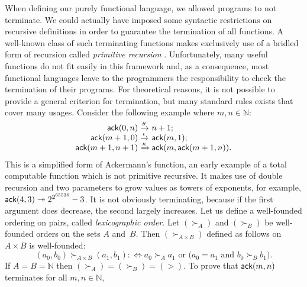 \label{par:ackermann}
When defining our purely functional language, we allowed programs to
not terminate. We could actually have imposed some syntactic
restrictions on recursive definitions in order to guarantee the
termination of all functions. A well\hyp{}known class of such
terminating functions makes exclusively use of a bridled form of
recursion called \emph{primitive recursion}
\citep{Robinson_1947,Robinson_1948}. Unfortunately, many useful functions do not fit easily
in this framework and, as a consequence, most functional languages
leave to the programmers the responsibility to check the termination
of their programs. For theoretical reasons, it is not possible to
provide a general criterion for termination, but many standard rules
exists that cover many usages. Consider the following example where
\(m,n \in \mathbb{N}\):
\begin{equation*}
\begin{array}{@{}r@{\;}l@{\;}l@{}}
\fun{ack}(0,n)     & \xrightarrow{\smash{\theta}} & n+1;\\
\fun{ack}(m+1,0)   & \xrightarrow{\smash{\iota}}  & \fun{ack}(m,1);\\
\fun{ack}(m+1,n+1) & \xrightarrow{\smash{\kappa}} 
                   & \fun{ack}(m,\fun{ack}(m+1,n)).
\end{array}
\end{equation*}
This is a simplified form of Ackermann's
function, an early example of a total
computable function which is not primitive recursive. It makes use of
double recursion and two parameters to grow values as towers of
exponents, for example, \(\textsf{ack}(4,3) \twoheadrightarrow
2^{2^{65536}} - 3\). It is not obviously terminating, because if the
first argument does decrease, the second largely increases. Let us
define a well\hyp{}founded ordering on pairs, called
\emph{lexicographic order}. Let
\((\succ_A)\) and \((\succ_B)\) be well\hyp{}founded orders on the
sets \(A\) and~\(B\). Then \((\succ_{A \times B})\) defined as follows
on \(A \times B\) is well\hyp{}founded:
\begin{equation}
(a_0,b_0) \succ_{A \times B} (a_1,b_1) :\Leftrightarrow \text{\(a_0
    \succ_A a_1\) or (\(a_0 = a_1\) and \(b_0 \succ_B b_1\)).}
\label{def:lexico}
\end{equation}
If \(A=B=\mathbb{N}\) then \((\succ_A) = (\succ_B) = (>)\). To prove
that \(\textsf{ack}(m,n)\) terminates for all \(m,n \in \mathbb{N}\),

